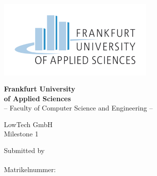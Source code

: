 \thispagestyle{empty}
\begin{titlepage}


  \vspace*{-3,5cm}
  \begin{center}
    \includegraphics[width=7.7cm]{Images/fra-uas_logo} \\ 
  \end{center}

  \begin{center}
    \vspace{0.1cm}
    \LARGE \textbf{Frankfurt University\\ of Applied Sciences}\\
    \vspace{0.4cm}
    \Large -- Faculty of Computer Science and Engineering --
  \end{center}

  \vfill

  \begin{center}
    \huge \textbf{\ThesisTitle}    
  \end{center} 

  \vfill

  \begin{center}
    \Large LowTech GmbH\\
    \vspace{0.3cm}
    \Large Milestone 1    
  \end{center}


  \vfill

  \begin{center}
    \Large Submitted by\\ 
    \vspace{0.3cm}
    \Large \textbf{\myName}\\
    \vspace{0.3cm}
    \normalsize Matrikelnummer: \myStudentId   
  \end{center}


  \vfill




\newpage


  

\end{titlepage}